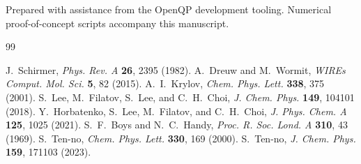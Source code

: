 \documentclass[aps,prb,reprint,superscriptaddress,floatfix]{revtex4-2}
\begin{document}
\begin{acknowledgments}
Prepared with assistance from the OpenQP development tooling. Numerical
proof-of-concept scripts accompany this manuscript.
\end{acknowledgments}

\begin{thebibliography}{99}

 J.~Schirmer, \textit{Phys. Rev. A} \textbf{26}, 2395 (1982).
 A.~Dreuw and M.~Wormit, \textit{WIREs Comput. Mol. Sci.}
\textbf{5}, 82 (2015).
 A.~I.~Krylov, \textit{Chem. Phys. Lett.} \textbf{338}, 375 (2001).
 S.~Lee, M.~Filatov, S.~Lee, and C.~H.~Choi,
\textit{J. Chem. Phys.} \textbf{149}, 104101 (2018).
 Y.~Horbatenko, S.~Lee, M.~Filatov, and C.~H.~Choi,
\textit{J. Phys. Chem. A} \textbf{125}, 1025 (2021).
 S.~F.~Boys and N.~C.~Handy,
\textit{Proc. R. Soc. Lond. A} \textbf{310}, 43 (1969).
 S.~Ten-no, \textit{Chem. Phys. Lett.} \textbf{330}, 169 (2000).
 S.~Ten-no, \textit{J. Chem. Phys.} \textbf{159}, 171103 (2023).

\end{thebibliography}
\end{document}
